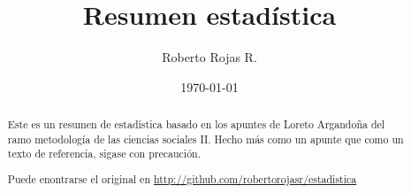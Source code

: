 \documentclass[10pt,letterpaper,oneside]{article}
\begin{document}
\title{Resumen estadística}
\author{Roberto Rojas R.}
\date{\today}
\maketitle

\begin{abstract}
Este es un resumen de estadística basado en los apuntes de Loreto Argandoña del ramo
metodología de las ciencias sociales II. Hecho más como un apunte que como un texto de
referencia, sigase con precaución.

Puede enontrarse el original en \url{http://github.com/robertorojasr/estadistica}
\end{abstract}
\end{document}
